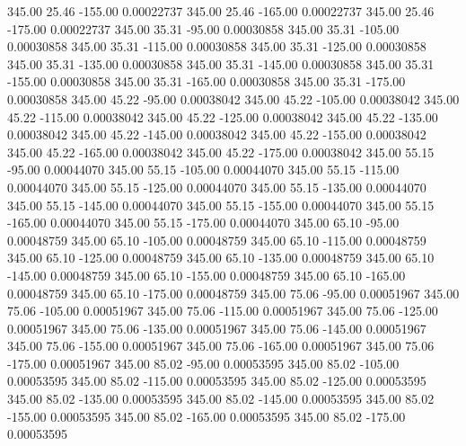     345.00     25.46   -155.00     0.00022737
    345.00     25.46   -165.00     0.00022737
    345.00     25.46   -175.00     0.00022737
    345.00     35.31    -95.00     0.00030858
    345.00     35.31   -105.00     0.00030858
    345.00     35.31   -115.00     0.00030858
    345.00     35.31   -125.00     0.00030858
    345.00     35.31   -135.00     0.00030858
    345.00     35.31   -145.00     0.00030858
    345.00     35.31   -155.00     0.00030858
    345.00     35.31   -165.00     0.00030858
    345.00     35.31   -175.00     0.00030858
    345.00     45.22    -95.00     0.00038042
    345.00     45.22   -105.00     0.00038042
    345.00     45.22   -115.00     0.00038042
    345.00     45.22   -125.00     0.00038042
    345.00     45.22   -135.00     0.00038042
    345.00     45.22   -145.00     0.00038042
    345.00     45.22   -155.00     0.00038042
    345.00     45.22   -165.00     0.00038042
    345.00     45.22   -175.00     0.00038042
    345.00     55.15    -95.00     0.00044070
    345.00     55.15   -105.00     0.00044070
    345.00     55.15   -115.00     0.00044070
    345.00     55.15   -125.00     0.00044070
    345.00     55.15   -135.00     0.00044070
    345.00     55.15   -145.00     0.00044070
    345.00     55.15   -155.00     0.00044070
    345.00     55.15   -165.00     0.00044070
    345.00     55.15   -175.00     0.00044070
    345.00     65.10    -95.00     0.00048759
    345.00     65.10   -105.00     0.00048759
    345.00     65.10   -115.00     0.00048759
    345.00     65.10   -125.00     0.00048759
    345.00     65.10   -135.00     0.00048759
    345.00     65.10   -145.00     0.00048759
    345.00     65.10   -155.00     0.00048759
    345.00     65.10   -165.00     0.00048759
    345.00     65.10   -175.00     0.00048759
    345.00     75.06    -95.00     0.00051967
    345.00     75.06   -105.00     0.00051967
    345.00     75.06   -115.00     0.00051967
    345.00     75.06   -125.00     0.00051967
    345.00     75.06   -135.00     0.00051967
    345.00     75.06   -145.00     0.00051967
    345.00     75.06   -155.00     0.00051967
    345.00     75.06   -165.00     0.00051967
    345.00     75.06   -175.00     0.00051967
    345.00     85.02    -95.00     0.00053595
    345.00     85.02   -105.00     0.00053595
    345.00     85.02   -115.00     0.00053595
    345.00     85.02   -125.00     0.00053595
    345.00     85.02   -135.00     0.00053595
    345.00     85.02   -145.00     0.00053595
    345.00     85.02   -155.00     0.00053595
    345.00     85.02   -165.00     0.00053595
    345.00     85.02   -175.00     0.00053595
